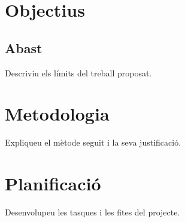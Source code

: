 \documentclass[TFG,PR,CAT]{P3CTeX}
\begin{document}
\section{Objectius}\label{pr1:objectius}

\subsection{Abast}
Descriviu els límits del treball proposat.

\section{Metodologia}\label{pr1:metodologia}
Expliqueu el mètode seguit i la seva justificació.

\section{Planificació}
Desenvolupeu les tasques i les fites del projecte.
\end{document}
